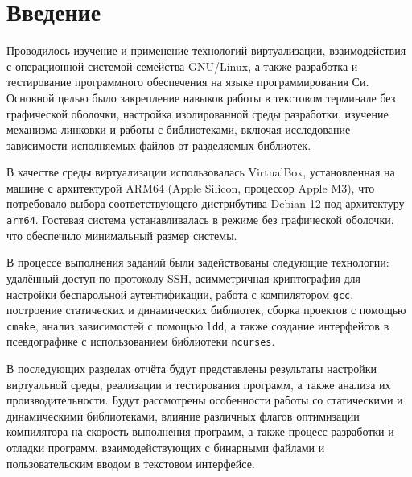 \section*{Введение}

Проводилось изучение и применение технологий виртуализации, взаимодействия с операционной системой семейства GNU/Linux, а также разработка и тестирование программного обеспечения на языке программирования Си. Основной целью было закрепление навыков работы в текстовом терминале без графической оболочки, настройка изолированной среды разработки, изучение механизма линковки и работы с библиотеками, включая исследование зависимости исполняемых файлов от разделяемых библиотек.

В качестве среды виртуализации использовалась VirtualBox, установленная на машине с архитектурой ARM64 (Apple Silicon, процессор Apple M3), что потребовало выбора соответствующего дистрибутива Debian 12 под архитектуру \texttt{arm64}. Гостевая система устанавливалась в режиме без графической оболочки, что обеспечило минимальный размер системы.

В процессе выполнения заданий были задействованы следующие технологии: удалённый доступ по протоколу SSH, асимметричная криптография для настройки беспарольной аутентификации, работа с компилятором \texttt{gcc}, построение статических и динамических библиотек, сборка проектов с помощью \texttt{cmake}, анализ зависимостей с помощью \texttt{ldd}, а также создание интерфейсов в псевдографике с использованием библиотеки \texttt{ncurses}.

В последующих разделах отчёта будут представлены результаты настройки виртуальной среды, реализации и тестирования программ, а также анализа их производительности. Будут рассмотрены особенности работы со статическими и динамическими библиотеками, влияние различных флагов оптимизации компилятора на скорость выполнения программ, а также процесс разработки и отладки программ, взаимодействующих с бинарными файлами и пользовательским вводом в текстовом интерфейсе.
